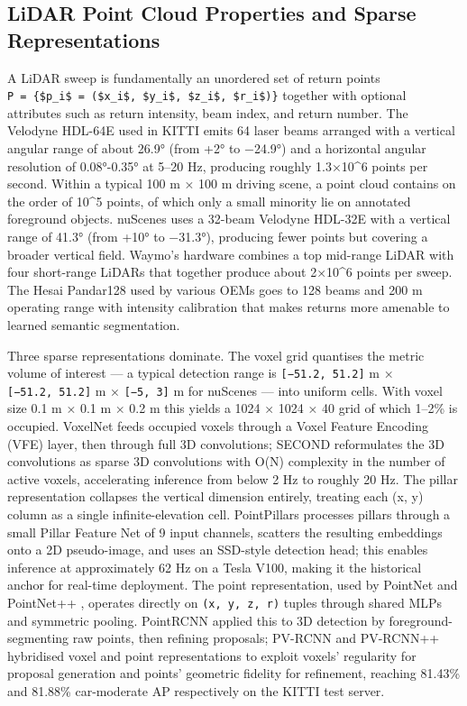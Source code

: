 \documentclass{article}
\begin{document}
\subsection{LiDAR Point Cloud Properties and Sparse Representations}\label{lidar-point-cloud-properties-and-sparse-representations}

A LiDAR sweep is fundamentally an unordered set of return points \texttt{P\ =\ \{\$p\_i\$\ =\ (\$x\_i\$,\ \$y\_i\$,\ \$z\_i\$,\ \$r\_i\$)\}} together with optional attributes such as return intensity, beam index, and return number. The Velodyne HDL-64E used in KITTI emits 64 laser beams arranged with a vertical angular range of about 26.9° (from +2° to −24.9°) and a horizontal angular resolution of 0.08°-0.35° at 5--20 Hz, producing roughly 1.3×10\^{}6 points per second. Within a typical 100 m × 100 m driving scene, a point cloud contains on the order of 10\^{}5 points, of which only a small minority lie on annotated foreground objects. nuScenes uses a 32-beam Velodyne HDL-32E with a vertical range of 41.3° (from +10° to −31.3°), producing fewer points but covering a broader vertical field. Waymo's hardware combines a top mid-range LiDAR with four short-range LiDARs that together produce about 2×10\^{}6 points per sweep. The Hesai Pandar128 used by various OEMs goes to 128 beams and 200 m operating range with intensity calibration that makes returns more amenable to learned semantic segmentation.

Three sparse representations dominate. The voxel grid quantises the metric volume of interest --- a typical detection range is \texttt{{[}−51.2,\ 51.2{]}} m × \texttt{{[}−51.2,\ 51.2{]}} m × \texttt{{[}−5,\ 3{]}} m for nuScenes --- into uniform cells. With voxel size 0.1 m × 0.1 m × 0.2 m this yields a 1024 × 1024 × 40 grid of which 1--2\% is occupied. VoxelNet \citep{zhou2017voxelnetendtoendle} feeds occupied voxels through a Voxel Feature Encoding (VFE) layer, then through full 3D convolutions; SECOND \citep{yan2018secondsparselyembe} reformulates the 3D convolutions as sparse 3D convolutions with O(N) complexity in the number of active voxels, accelerating inference from below 2 Hz to roughly 20 Hz. The pillar representation collapses the vertical dimension entirely, treating each (x, y) column as a single infinite-elevation cell. PointPillars \citep{lang2019pointpillarsfasten} processes pillars through a small Pillar Feature Net of 9 input channels, scatters the resulting embeddings onto a 2D pseudo-image, and uses an SSD-style detection head; this enables inference at approximately 62 Hz on a Tesla V100, making it the historical anchor for real-time deployment. The point representation, used by PointNet \citep{qi2017pointnetdeeplearni} and PointNet++ \citep{qi2017pointnetdeeplearni}, operates directly on \texttt{(x,\ y,\ z,\ r)} tuples through shared MLPs and symmetric pooling. PointRCNN \citep{shi2019pointrcnn3dobjectp} applied this to 3D detection by foreground-segmenting raw points, then refining proposals; PV-RCNN \citep{shi2019pointrcnn3dobjectp} and PV-RCNN++ \citep{shi2022pvrcnnpointvoxelfe} hybridised voxel and point representations to exploit voxels' regularity for proposal generation and points' geometric fidelity for refinement, reaching 81.43\% and 81.88\% car-moderate AP respectively on the KITTI test server.
\end{document}
